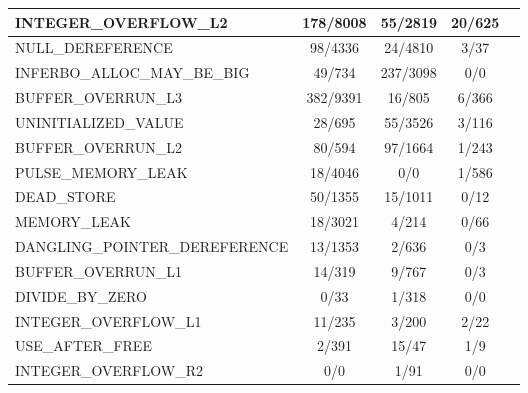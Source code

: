 \begin{table}[ht]
\begin{tabular}{!{\vrule width 1pt}l!{\vrule width 1pt}c|c|c!{\vrule width 1pt}c!{\vrule width 1pt}}
         {\scriptsize INTEGER\_OVERFLOW\_L2}&  {\footnotesize 178/8008}&  {\footnotesize 55/2819}&  {\footnotesize 20/625}\\ \hline
         {\scriptsize NULL\_DEREFERENCE}&      {\footnotesize 98/4336}&  {\footnotesize 24/4810}&  {\footnotesize 3/37}\\ \hline
         {\scriptsize INFERBO\_ALLOC\_MAY\_BE\_BIG}&  {\footnotesize 49/734}&  {\footnotesize 237/3098}&  {\footnotesize 0/0}\\ \hline
         {\scriptsize BUFFER\_OVERRUN\_L3}&    {\footnotesize 382/9391}&  {\footnotesize 16/805}&  {\footnotesize 6/366}\\ \hline
         {\scriptsize UNINITIALIZED\_VALUE}&   {\footnotesize 28/695}&  {\footnotesize 55/3526}&  {\footnotesize 3/116}\\ \hline
         {\scriptsize BUFFER\_OVERRUN\_L2}&    {\footnotesize 80/594}&  {\footnotesize 97/1664}&  {\footnotesize 1/243}\\ \hline
         {\scriptsize PULSE\_MEMORY\_LEAK}&    {\footnotesize 18/4046}&  {\footnotesize 0/0}&  {\footnotesize 1/586}\\ \hline
         {\scriptsize DEAD\_STORE}&            {\footnotesize 50/1355}&  {\footnotesize 15/1011}&  {\footnotesize 0/12}\\ \hline
         {\scriptsize MEMORY\_LEAK}&           {\footnotesize 18/3021}&  {\footnotesize 4/214}&  {\footnotesize 0/66}\\ \hline
         {\scriptsize DANGLING\_POINTER\_DEREFERENCE}&  {\footnotesize 13/1353}&  {\footnotesize 2/636}&  {\footnotesize 0/3}\\ \hline
         {\scriptsize BUFFER\_OVERRUN\_L1}&    {\footnotesize 14/319}&  {\footnotesize 9/767}&  {\footnotesize 0/3}\\ \hline
         {\scriptsize DIVIDE\_BY\_ZERO}&       {\footnotesize 0/33}&  {\footnotesize 1/318}&  {\footnotesize 0/0}\\ \hline
         {\scriptsize INTEGER\_OVERFLOW\_L1}&  {\footnotesize 11/235}&  {\footnotesize 3/200}&  {\footnotesize 2/22}\\ \hline
         {\scriptsize USE\_AFTER\_FREE}&       {\footnotesize 2/391}&  {\footnotesize 15/47}&  {\footnotesize 1/9}\\ \hline
         {\scriptsize INTEGER\_OVERFLOW\_R2}&  {\footnotesize 0/0}&  {\footnotesize 1/91}&  {\footnotesize 0/0}\\ \hline

\end{tabular}
\end{table}
